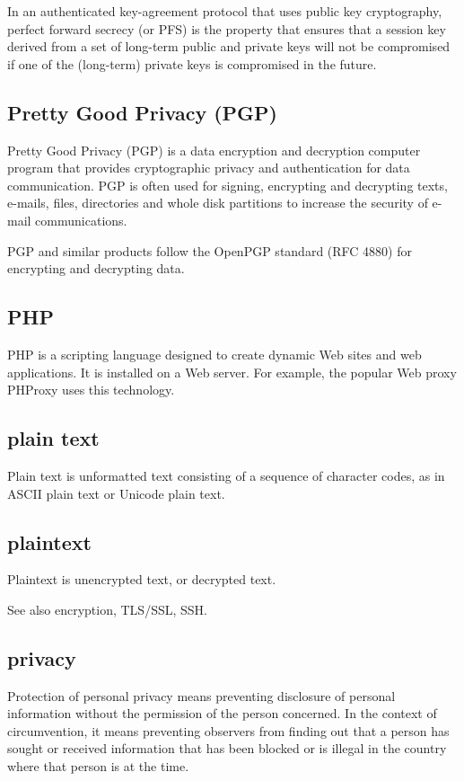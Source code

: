 In an authenticated key-agreement protocol that uses public key
cryptography, perfect forward secrecy (or PFS) is the property that
ensures that a session key derived from a set of long-term public and
private keys will not be compromised if one of the (long-term) private
keys is compromised in the future.

\subsection{Pretty Good Privacy (PGP)}

Pretty Good Privacy (PGP) is a data encryption and decryption computer
program that provides cryptographic privacy and authentication for data
communication. PGP is often used for signing, encrypting and decrypting
texts, e-mails, files, directories and whole disk partitions to increase
the security of e-mail communications.

PGP and similar products follow the OpenPGP standard (RFC 4880) for
encrypting and decrypting data.

\subsection{PHP}

PHP is a scripting language designed to create dynamic Web sites and web
applications. It is installed on a Web server. For example, the popular
Web proxy PHProxy uses this technology.

\subsection{plain text}

Plain text is unformatted text consisting of a sequence of character
codes, as in ASCII plain text or Unicode plain text.

\subsection{plaintext}

Plaintext is unencrypted text, or decrypted text.

See also encryption, TLS/SSL, SSH.

\subsection{privacy}

Protection of personal privacy means preventing disclosure of personal
information without the permission of the person concerned. In the
context of circumvention, it means preventing observers from finding out
that a person has sought or received information that has been blocked
or is illegal in the country where that person is at the time.

